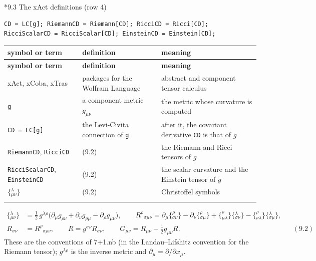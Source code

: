 \documentclass[10pt,a4paper]{article}
\makeatletter
\renewcommand\subsection{\@startsection{subsection}{2}{\z@}{-3.25ex\@plus -1ex \@minus -.2ex}{1.5ex \@plus .2ex}{\normalfont\large\bfseries\raggedright}}
\makeatother
\begin{document}
\subsection*{9.3 The xAct definitions (row 4)}
\begin{Verbatim}[fontsize=\small,frame=single,framesep=2mm]
CD = LC[g]; RiemannCD = Riemann[CD]; RicciCD = Ricci[CD];
RicciScalarCD = RicciScalar[CD]; EinsteinCD = Einstein[CD];
\end{Verbatim}
{\footnotesize
\begin{longtable}{>{\raggedright\arraybackslash}p{}>{\raggedright\arraybackslash}p{}>{\raggedright\arraybackslash}p{}}
\toprule
\textbf{symbol or term} & \textbf{definition} & \textbf{meaning} \\
\midrule\endfirsthead
\toprule
\textbf{symbol or term} & \textbf{definition} & \textbf{meaning} \\
\midrule\endhead
\endfoot
\bottomrule\endlastfoot
xAct, xCoba, xTras & packages for the Wolfram Language & abstract and component tensor calculus \\
\texttt{g} & a component metric $g_{\mu\nu}$ & the metric whose curvature is computed \\
\texttt{CD = LC[g]} & the Levi-Civita connection of \texttt{g} & after it, the covariant derivative \texttt{CD} is that of $g$ \\
\texttt{RiemannCD}, \texttt{RicciCD} & (9.2) & the Riemann and Ricci tensors of $g$ \\
\texttt{RicciScalarCD}, \texttt{EinsteinCD} & (9.2) & the scalar curvature and the Einstein tensor of $g$ \\
$\{{}^{\lambda}_{\mu\nu}\}$ & (9.2) & Christoffel symbols \\*
\end{longtable}}
\begin{align*}
\{{}^{\lambda}_{\mu\nu}\}&=\tfrac12\,g^{\lambda\rho}\big(\partial_\mu g_{\rho\nu}+\partial_\nu g_{\rho\mu}-\partial_\rho g_{\mu\nu}\big),\qquad R^{\rho}{}_{\sigma\mu\nu}=\partial_\mu\{{}^{\rho}_{\sigma\nu}\}-\partial_\nu\{{}^{\rho}_{\sigma\mu}\}+\{{}^{\rho}_{\mu\lambda}\}\{{}^{\lambda}_{\sigma\nu}\}-\{{}^{\rho}_{\nu\lambda}\}\{{}^{\lambda}_{\sigma\mu}\}, \\
R_{\sigma\nu}&=R^\rho{}_{\sigma\rho\nu},\qquad R=g^{\sigma\nu}R_{\sigma\nu},\qquad G_{\mu\nu}=R_{\mu\nu}-\tfrac12g_{\mu\nu}R .&&(9.2)
\end{align*}
These are the conventions of 7+1.nb (in the Landau–Lifshitz convention for the Riemann tensor); $g^{\lambda\rho}$ is the inverse metric and $\partial_\mu=\partial/\partial x_\mu$.
\end{document}
